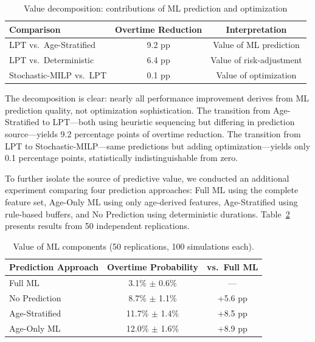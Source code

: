 \documentclass[11pt,a4paper]{article}
\begin{document}
\begin{table}[htbp]
\centering
\caption{Value decomposition: contributions of ML prediction and optimization}
\label{tab:value_analysis}
\begin{tabular}{@{}lcc@{}}
\toprule
\textbf{Comparison} & \textbf{Overtime Reduction} & \textbf{Interpretation} \\
\midrule
LPT vs.\ Age-Stratified & 9.2 pp & Value of ML prediction \\
LPT vs.\ Deterministic & 6.4 pp & Value of risk-adjustment \\
Stochastic-MILP vs.\ LPT & 0.1 pp & Value of optimization \\
\bottomrule
\end{tabular}
\end{table}

The decomposition is clear: nearly all performance improvement derives from ML prediction quality, not optimization sophistication. The transition from Age-Stratified to LPT---both using heuristic sequencing but differing in prediction source---yields 9.2 percentage points of overtime reduction. The transition from LPT to Stochastic-MILP---same predictions but adding optimization---yields only 0.1 percentage points, statistically indistinguishable from zero.

To further isolate the source of predictive value, we conducted an additional experiment comparing four prediction approaches: Full ML using the complete feature set, Age-Only ML using only age-derived features, Age-Stratified using rule-based buffers, and No Prediction using deterministic durations. Table~\ref{tab:ml_value} presents results from 50 independent replications.


\begin{table}[H]
\centering
\caption{Value of ML components (50 replications, 100 simulations each). }
\label{tab:ml_value}
\begin{tabular}{@{}lcc@{}}
\toprule
\textbf{Prediction Approach} & \textbf{Overtime Probability} & \textbf{vs.\ Full ML} \\
\midrule
Full ML & 3.1\% $\pm$ 0.6\% & --- \\
No Prediction & 8.7\% $\pm$ 1.1\% & +5.6 pp \\
Age-Stratified & 11.7\% $\pm$ 1.4\% & +8.5 pp \\
Age-Only ML & 12.0\% $\pm$ 1.6\% & +8.9 pp \\
\bottomrule
\end{tabular}
\end{table}
\end{document}

